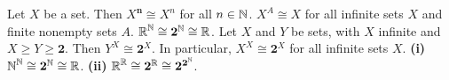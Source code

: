  Let $X$ be a set. Then $X^{\mathbf{n}} \cong X^n$ for all $n \in \N$.
 $X^A \cong X$ for all infinite sets $X$ and finite nonempty sets $A$.
 $\R^{\N} \cong \mathbf{2}^{\N} \cong \R$.
 Let $X$ and $Y$ be sets, with $X$ infinite and $X \geq Y \geq \mathbf{2}$. Then $Y^X \cong \mathbf{2}^X$. In particular, $X^X \cong \mathbf{2}^X$ for all infinite sets $X$.
 \textbf{(i)} $\N^{\N} \cong \mathbf{2}^{\N} \cong \R$. \textbf{(ii)} $\R^{\R} \cong \mathbf{2}^{\R} \cong \mathbf{2}^{\mathbf{2}^{\N}}$.
